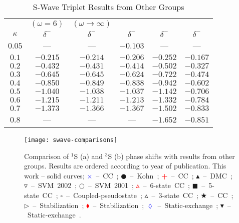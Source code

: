 \documentclass[Dissertation.tex]{subfiles}
\begin{document}
\begin{table}[H]
\begin{center}
\begin{tabular}{c c c c c c}
\toprule
 & $(\omega = 6)$ & $(\omega \rightarrow \infty)$ &  &  &   \\
$\kappa$ & $\delta^-$ \cite{VanReeth2003} & $\delta^-$ \cite{VanReeth2003} & $\delta^-$ \cite{Blackwood2002} & $\delta^-$ \cite{Ray1997} & $\delta^-$ \cite{Adhikari1999} \\
\midrule
$0.05$ & --- & --- & $-0.103$ & --- & --- \\
$0.1$ & $-0.215$ & $-0.214$ & $-0.206$ & $-0.252$ & $-0.167$ \\
$0.2$ & $-0.432$ & $-0.431$ & $-0.414$ & $-0.502$ & $-0.327$ \\
$0.3$ & $-0.645$ & $-0.645$ & $-0.624$ & $-0.722$ & $-0.474$ \\
$0.4$ & $-0.850$ & $-0.849$ & $-0.838$ & $-0.942$ & $-0.602$ \\
$0.5$ & $-1.040$ & $-1.038$ & $-1.037$ & $-1.142$ & $-0.706$ \\
$0.6$ & $-1.215$ & $-1.211$ & $-1.213$ & $-1.332$ & $-0.784$ \\
$0.7$ & $-1.373$ & $-1.366$ & $-1.367$ & $-1.502$ & $-0.833$ \\
$0.8$ &    --- &    --- &    --- & $-1.652$ & $-0.851$ \\
\bottomrule
\end{tabular}
\caption{S-Wave Triplet Results from Other Groups}
\label{tab:SWaveTripletOther}
\end{center}
\end{table}


\begin{figure}[H]
	\centering
	\texttt{[image: swave-comparisons]}
	\caption[Comparison of S-wave phase shifts]{Comparison of $^1$S (a) and $^3$S (b) phase shifts with results from other groups. Results are ordered according to year of publication. This work -- solid curves; \mbox{\textcolor{blue}{$\times$} -- CC \cite{Walters2004};} \mbox{$\CIRCLE$ -- Kohn \cite{VanReeth2003};} \mbox{\textcolor{red}{\textbf{+}} -- CC \cite{Blackwood2002};} \mbox{$\blacktriangle$ -- DMC \cite{Chiesa2002};} \mbox{$\triangledown$ -- SVM 2002 \cite{Ivanov2002};} \mbox{$\Circle$ -- SVM 2001 \cite{Ivanov2001};} \mbox{\textcolor{red}{$\vartriangle$} -- 6-state CC \cite{Sinha2000};} \mbox{$\blacksquare$ -- 5-state CC \cite{Adhikari1999};} \mbox{$\square$ -- Coupled-pseudostate \cite{Campbell1998};} \mbox{$\vartriangle$ -- 3-state CC \cite{Sinha1997};} \mbox{\textcolor[RGB]{0,127,0}{$\bigstar$} -- CC \cite{Ray1997};} \mbox{$\triangleright$ -- Stabilization \cite{Drachman1976};} \mbox{\textcolor{red}{$\blacklozenge$} -- Stabilization \cite{Drachman1975};} \mbox{\textcolor{blue}{$\lozenge$} -- Static-exchange \cite{Hara1975};} \mbox{$\blacktriangledown$ -- Static-exchange \cite{Fraser1961}.}}
	\label{fig:SWaveComparisons}
\end{figure}
\end{document}

